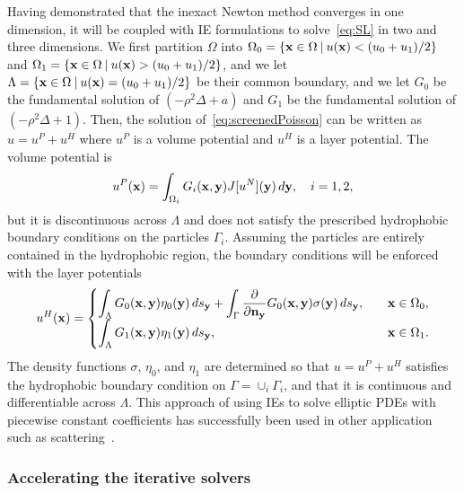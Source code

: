 Having demonstrated that the inexact Newton method converges in one
dimension, it will be coupled with IE formulations to 
solve~\eqref{eq:SL} in two and three dimensions. We first partition
$\Omega$ into $\Omega_0 = \{\mathbf{x} \in \Omega \:|\: u(\mathbf{x}) < (u_0 +
u_1)/2\}$ and $\Omega_1 = \{\mathbf{x} \in \Omega \:|\: u(\mathbf{x}) > (u_0 +
u_1)/2\}$, and we let $\Lambda = \{\mathbf{x} \in \Omega \:|\: u(\mathbf{x}) = (u_0 +
u_1)/2 \}$ be their common boundary, and we let $G_0$ be the fundamental
solution of $(-\rho^2 \Delta + a)$ and $G_1$ be the fundamental
solution of $(-\rho^2 \Delta + 1)$. Then, the solution
of~\eqref{eq:screenedPoisson} can be written as $u = u^P + u^H$ where
$u^P$ is a volume potential and $u^H$ is a layer potential. The volume
potential is
\begin{align*}
  u^{P}(\mathbf{x}) = \int_{\Omega_i} G_i(\mathbf{x},\mathbf{y}) J[u^N](\mathbf{y})\, d\mathbf{y}, 
    \quad i = 1,2,
\end{align*}
but it is discontinuous across $\Lambda$ and does not satisfy the
prescribed hydrophobic boundary conditions on the particles $\Gamma_i$.
Assuming the particles are entirely contained in the hydrophobic region,
the boundary conditions will be enforced with the layer potentials
\begin{align*}
  u^{H}(\mathbf{x}) = \begin{cases}
    \displaystyle\int_{\Lambda} G_0(\mathbf{x},\mathbf{y}) \eta_0(\mathbf{y}) \, ds_{\mathbf{y}} + 
    \displaystyle\int_{\Gamma} \frac{\partial }{\partial \mathbf{n}_{\mathbf{y}}} G_0(\mathbf{x},\mathbf{y})
      \sigma(\mathbf{y}) \,ds_{\mathbf{y}}, \quad & \mathbf{x} \in \Omega_0, \\
    \displaystyle\int_{\Lambda} G_1(\mathbf{x},\mathbf{y}) \eta_1(\mathbf{y}) \, ds_{\mathbf{y}},
     & \mathbf{x} \in \Omega_1.
  \end{cases}
\end{align*}
The density functions $\sigma$, $\eta_0$, and $\eta_1$ are determined so
that $u = u^P + u^H$ satisfies the hydrophobic boundary condition on
$\Gamma = \cup_i \Gamma_i$, and that it is continuous and differentiable
across $\Lambda$. This approach of using IEs to solve elliptic PDEs with
piecewise constant coefficients has successfully been used in other
application such as scattering~\cite{hyu-bar2014, che-cho-cai2018}.

\subsubsection{Accelerating the iterative solvers}
\label{subsec:NumericalIssues}

